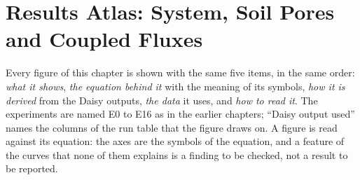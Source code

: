 \chapter{Results Atlas: System, Soil Pores and Coupled Fluxes}\label{chap:19}
Every figure of this chapter is shown with the same five items, in the same order: \emph{what it shows}, \emph{the equation behind it} with the meaning of its symbols, \emph{how it is derived} from the Daisy outputs, \emph{the data} it uses, and \emph{how to read it}. The experiments are named E0 to E16 as in the earlier chapters; ``Daisy output used'' names the columns of the run table that the figure draws on. A figure is read against its equation: the axes are the symbols of the equation, and a feature of the curves that none of them explains is a finding to be checked, not a result to be reported.
